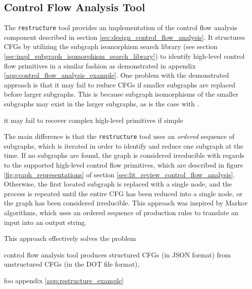 
\subsection{Control Flow Analysis Tool}


%

The \texttt{restructure} tool provides an implementation of the control flow analysis component described in section \ref{sec:design_control_flow_analysis}. It structures CFGs by utilizing the subgraph isomorphism search library (see section \ref{sec:impl_subgraph_isomorphism_search_library}) to identify high-level control flow primitives in a similar fashion as demonstrated in appendix \ref{app:control_flow_analysis_example}. One problem with the demonstrated approach is that it may fail to reduce CFGs if smaller subgraphs are replaced before larger subgraphs. This is because subgraph isomorphisms of the smaller subgraphs may exist in the larger subgraphs, as is the case with .

it may fail to recover complex high-level primitives if simple


 The main difference is that the \texttt{restructure} tool uses an \textit{ordered} sequence of subgraphs, which is iterated in order to identify and reduce one subgraph at the time. If no subgraphs are found, the graph is considered irreducible with regards to the supported high-level control flow primitives, which are described in figure \ref{fig:graph_representations} of section \ref{sec:lit_review_control_flow_analysis}. Otherwise, the first located subgraph is replaced with a single node, and the process is repeated until the entire CFG has been reduced into a single node, or the graph has been considered irreducible. This approach was inspired by Markov algorithms, which uses an ordered sequence of production rules to translate an input into an output string.

This approach effectively solves the problem


control flow analysis tool produces structured CFGs (in JSON format) from unstructured CFGs (in the DOT file format),

foo appendix \ref{app:restructure_example}
